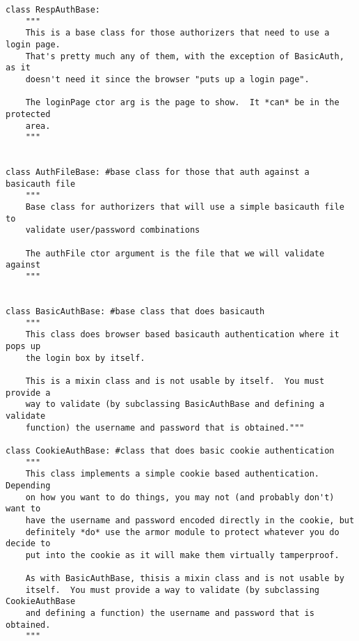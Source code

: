 \documentclass{manual}
\begin{document}
\begin{verbatim}
class RespAuthBase:
    """
    This is a base class for those authorizers that need to use a login page.
    That's pretty much any of them, with the exception of BasicAuth, as it
    doesn't need it since the browser "puts up a login page".

    The loginPage ctor arg is the page to show.  It *can* be in the protected
    area.
    """


class AuthFileBase: #base class for those that auth against a basicauth file
    """
    Base class for authorizers that will use a simple basicauth file to
    validate user/password combinations

    The authFile ctor argument is the file that we will validate against
    """


class BasicAuthBase: #base class that does basicauth
    """
    This class does browser based basicauth authentication where it pops up
    the login box by itself.

    This is a mixin class and is not usable by itself.  You must provide a
    way to validate (by subclassing BasicAuthBase and defining a validate
    function) the username and password that is obtained."""

class CookieAuthBase: #class that does basic cookie authentication
    """
    This class implements a simple cookie based authentication.  Depending
    on how you want to do things, you may not (and probably don't) want to
    have the username and password encoded directly in the cookie, but
    definitely *do* use the armor module to protect whatever you do decide to
    put into the cookie as it will make them virtually tamperproof.

    As with BasicAuthBase, thisis a mixin class and is not usable by
    itself.  You must provide a way to validate (by subclassing CookieAuthBase
    and defining a function) the username and password that is obtained.
    """

\end{verbatim}
\end{document}
